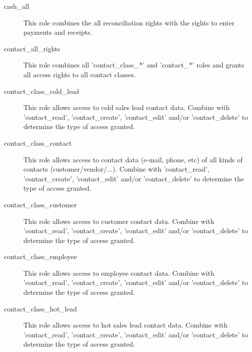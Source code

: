 \begin{description}
\item [cash\_all] \htmlspacing 
                         This role combines the all reconciliation rights with the rights to enter payments and receipts.
\item [contact\_all\_rights] \htmlspacing 
                         This role combines all 'contact\_class\_$\ast$' and 'contact\_$\ast$' roles and grants all access rights to all contact classes.
\item [contact\_class\_cold\_lead] \htmlspacing 
                         This role allows access to cold sales lead contact data.
                         Combine with 'contact\_read', 'contact\_create', 'contact\_edit' and/or 'contact\_delete' to determine
                         the type of access granted.
\item [contact\_class\_contact] \htmlspacing 
                         This role allows access to contact data (e-mail, phone, etc) of all kinds of contacts (customer/vendor/...).
                         Combine with 'contact\_read', 'contact\_create', 'contact\_edit' and/or 'contact\_delete' to determine
                         the type of access granted.
\item [contact\_class\_customer] \htmlspacing 
                         This role allows access to customer contact data.
                         Combine with 'contact\_read', 'contact\_create', 'contact\_edit' and/or 'contact\_delete' to determine
                         the type of access granted.
\item [contact\_class\_employee] \htmlspacing 
                         This role allows access to employee contact data.
                         Combine with 'contact\_read', 'contact\_create', 'contact\_edit' and/or 'contact\_delete' to determine
                         the type of access granted.
\item [contact\_class\_hot\_lead] \htmlspacing 
                         This role allows access to hot sales lead contact data.
                         Combine with 'contact\_read', 'contact\_create', 'contact\_edit' and/or 'contact\_delete' to determine
                         the type of access granted.

\end{description}
